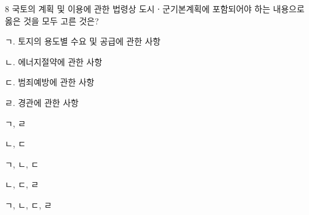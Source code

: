 \begin{question}{8}
국토의 계획 및 이용에 관한 법령상 도시ㆍ군기본계획에 포함되어야 하는 내용으로 옳은 것을 모두 고른 것은?
\begin{framedtext}
ㄱ. 토지의 용도별 수요 및 공급에 관한 사항 \par
ㄴ. 에너지절약에 관한 사항 \par
ㄷ. 범죄예방에 관한 사항 \par
ㄹ. 경관에 관한 사항 \par
\end{framedtext}
\begin{choices}
  \item ㄱ, ㄹ
  \item ㄴ, ㄷ
  \item ㄱ, ㄴ, ㄷ
  \item ㄴ, ㄷ, ㄹ
  \item ㄱ, ㄴ, ㄷ, ㄹ
\end{choices}
\end{question}
